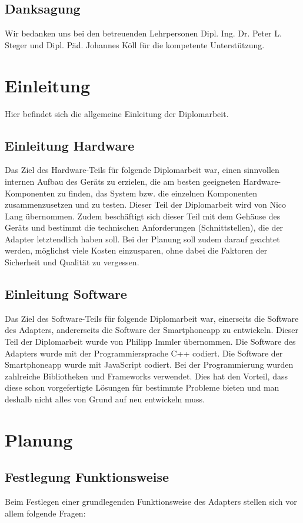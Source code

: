 \documentclass[]{article}
\begin{document}
\subsection{Danksagung}
Wir bedanken uns bei den betreuenden Lehrpersonen Dipl. Ing. Dr. Peter L. Steger und Dipl. Päd. Johannes Köll für die kompetente Unterstützung.
\tableofcontents

\section{Einleitung}
Hier befindet sich die allgemeine Einleitung der Diplomarbeit.

\subsection{Einleitung Hardware}
Das Ziel des Hardware-Teils für folgende Diplomarbeit war, einen sinnvollen internen Aufbau des Geräts zu erzielen, die am besten geeigneten Hardware-Komponenten zu finden, das System bzw. die einzelnen Komponenten zusammenzusetzen und zu testen. Dieser Teil der Diplomarbeit wird von Nico Lang übernommen.
Zudem beschäftigt sich dieser Teil mit dem Gehäuse des Geräts und bestimmt die technischen Anforderungen (Schnittstellen), die der Adapter letztendlich haben soll. 
Bei der Planung soll zudem darauf geachtet werden, möglichst viele Kosten einzusparen, ohne dabei die Faktoren der Sicherheit und Qualität zu vergessen.

\subsection{Einleitung Software}
Das Ziel des Software-Teils für folgende Diplomarbeit war, einerseits die Software des Adapters, andererseits die Software der Smartphoneapp zu entwickeln. Dieser Teil der Diplomarbeit wurde von Philipp Immler übernommen. Die Software des Adapters wurde mit der Programmiersprache C++ codiert. Die Software der Smartphoneapp wurde mit JavaScript codiert. Bei der Programmierung wurden zahlreiche Bibliotheken und Frameworks verwendet. Dies hat den Vorteil, dass diese schon vorgefertigte Lösungen für bestimmte Probleme bieten und man deshalb nicht alles von Grund auf neu entwickeln muss. 

\section{Planung}
\subsection{Festlegung Funktionsweise}
Beim Festlegen einer grundlegenden Funktionsweise des Adapters stellen sich vor allem folgende Fragen:
\end{document}
